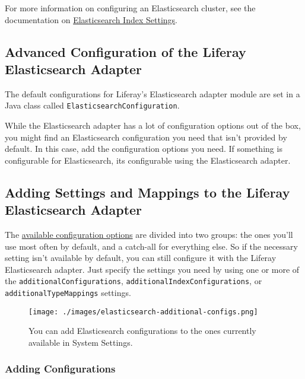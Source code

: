 \noindent\hrulefill

For more information on configuring an Elasticsearch cluster, see the
documentation on
\href{https://www.elastic.co/guide/en/elasticsearch/guide/current/_index_settings.html}{Elasticsearch
Index Settings}.

\subsection{Advanced Configuration of the Liferay Elasticsearch
Adapter}\label{advanced-configuration-of-the-liferay-elasticsearch-adapter}

The default configurations for Liferay's Elasticsearch adapter module
are set in a Java class called \texttt{ElasticsearchConfiguration}.

While the Elasticsearch adapter has a lot of configuration options out
of the box, you might find an Elasticsearch configuration you need that
isn't provided by default. In this case, add the configuration options
you need. If something is configurable for Elasticsearch, its
configurable using the Elasticsearch adapter.

\subsection{Adding Settings and Mappings to the Liferay Elasticsearch
Adapter}\label{adding-settings-and-mappings-to-the-liferay-elasticsearch-adapter}

The
\href{/docs/7-0/deploy/-/knowledge_base/d/elasticsearch-settings}{available
configuration options} are divided into two groups: the ones you'll use
most often by default, and a catch-all for everything else. So if the
necessary setting isn't available by default, you can still configure it
with the Liferay Elasticsearch adapter. Just specify the settings you
need by using one or more of the \texttt{additionalConfigurations},
\texttt{additionalIndexConfigurations}, or
\texttt{additionalTypeMappings} settings.

\begin{figure}
\centering
\texttt{[image: ./images/elasticsearch-additional-configs.png]}
\caption{You can add Elasticsearch configurations to the ones currently
available in System Settings.}
\end{figure}

\subsubsection{Adding Configurations}\label{adding-configurations}

